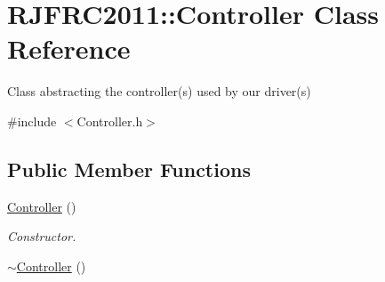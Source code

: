 \hypertarget{class_r_j_f_r_c2011_1_1_controller}{
\section{RJFRC2011::Controller Class Reference}
\label{class_r_j_f_r_c2011_1_1_controller}
}


Class abstracting the controller(s) used by our driver(s)  




{\ttfamily \#include $<$Controller.h$>$}

\subsection*{Public Member Functions}
\begin{DoxyCompactItemize}
\item 
\hyperlink{class_r_j_f_r_c2011_1_1_controller_ace98163d9d5fc6deec6bdc294c2ef593}{Controller} ()
\begin{DoxyCompactList}\small\item\em Constructor. \item\end{DoxyCompactList}\item 
\hypertarget{class_r_j_f_r_c2011_1_1_controller_a56d34929cf6b8e9f277728404ff67d5f}{
\hyperlink{class_r_j_f_r_c2011_1_1_controller_a56d34929cf6b8e9f277728404ff67d5f}{$\sim$Controller} ()}
\label{class_r_j_f_r_c2011_1_1_controller_a56d34929cf6b8e9f277728404ff67d5f}


\end{DoxyCompactItemize}
